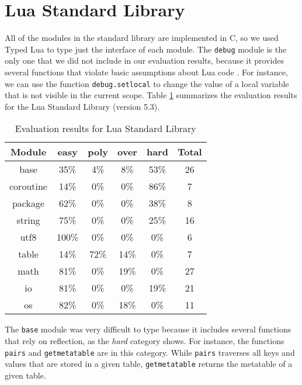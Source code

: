 \section{Lua Standard Library}

All of the modules in the standard library are implemented in C, so
we used Typed Lua to type just the interface of each module.
The \texttt{debug} module is the only one that we did not include in our
evaluation results, because it provides several functions that violate
basic assumptions about Lua code \cite{luamanual}.
For instance, we can use the function \texttt{debug.setlocal} to change the value
of a local variable that is not visible in the current scope.
Table \ref{tab:evallsl} summarizes the evaluation results for the Lua Standard Library
(version 5.3).

\begin{table}[!ht]
\begin{center}
\begin{tabular}{|c|c|c|c|c|c|}
\hline
\textbf{Module} & \textbf{easy} & \textbf{poly} & \textbf{over} & \textbf{hard} & \textbf{Total} \\
\hline
base & 35\% & 4\% & 8\% & 53\% & 26 \\ %
\hline
coroutine & 14\% & 0\% & 0\% & 86\% & 7 \\ %
\hline
package & 62\% & 0\% & 0\% & 38\% & 8 \\ %
\hline
string & 75\% & 0\% & 0\% & 25\% & 16 \\ %
\hline
utf8 & 100\% & 0\% & 0\% & 0\% & 6 \\ %
\hline
table & 14\% & 72\% & 14\% & 0\% & 7 \\ %
\hline
math & 81\% & 0\% & 19\% & 0\% & 27 \\ %
\hline
io & 81\% & 0\% & 0\% & 19\% & 21 \\ %
\hline
os & 82\% & 0\% & 18\% & 0\% & 11 \\ %
\hline
\end{tabular}
\end{center}
\caption{Evaluation results for Lua Standard Library}
\label{tab:evallsl}
\end{table}

The \texttt{base} module was very difficult to type
because it includes several functions that rely on reflection,
as the \emph{hard} category shows.
For instance, the functions \texttt{pairs} and \texttt{getmetatable}
are in this category.
While \texttt{pairs} traverses all keys and values that are stored
in a given table, \texttt{getmetatable} returns the metatable of a
given table.

